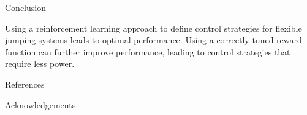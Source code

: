 \documentclass[final]{beamer}
\newlength{\onecolwid}
\begin{document}
\begin{frame}[t]
\begin{columns}[t]
\begin{column}{\onecolwid}
\begin{block}{Conclusion}

Using a reinforcement learning approach to define control strategies for flexible jumping systems leads to optimal performance. Using a correctly tuned reward function can further improve performance, leading to control strategies that require less power. 

\end{block}




\begin{block}{References}

\small{
}

\end{block}





\begin{block}{Acknowledgements}

\small{} \\

\end{block}



\end{column} %

\end{columns} %

\end{frame} %
\end{document}
